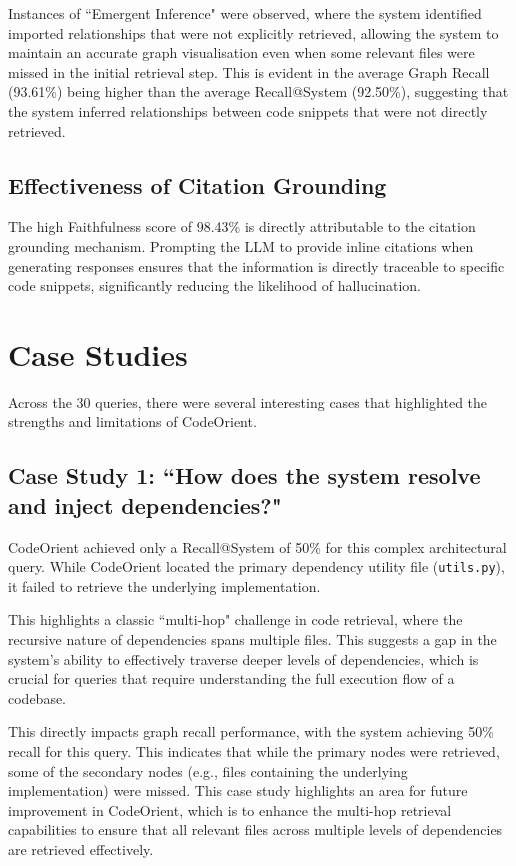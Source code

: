 Instances of ``Emergent Inference" were observed, where the system identified imported relationships that were not explicitly retrieved, allowing the system to maintain an accurate graph visualisation even when some relevant files were missed in the initial retrieval step. This is evident in the average Graph Recall (93.61\%) being higher than the average Recall@System (92.50\%), suggesting that the system inferred relationships between code snippets that were not directly retrieved.

\subsection{Effectiveness of Citation Grounding}
The high Faithfulness score of 98.43\% is directly attributable to the citation grounding mechanism. Prompting the LLM to provide inline citations when generating responses ensures that the information is directly traceable to specific code snippets, significantly reducing the likelihood of hallucination.
\section{Case Studies}
Across the 30 queries, there were several interesting cases that highlighted the strengths and limitations of CodeOrient.
\subsection{Case Study 1: ``How does the system resolve and inject dependencies?"}
\label{Case_Study_1}
CodeOrient achieved only a Recall@System of 50\% for this complex architectural query. While CodeOrient located the primary dependency utility file (\texttt{utils.py}), it failed to retrieve the underlying implementation.

This highlights a classic ``multi-hop" challenge in code retrieval, where the recursive nature of dependencies spans multiple files. This suggests a gap in the system's ability to effectively traverse deeper levels of dependencies, which is crucial for queries that require understanding the full execution flow of a codebase.

This directly impacts graph recall performance, with the system achieving 50\% recall for this query. This indicates that while the primary nodes were retrieved, some of the secondary nodes (e.g., files containing the underlying implementation) were missed. This case study highlights an area for future improvement in CodeOrient, which is to enhance the multi-hop retrieval capabilities to ensure that all relevant files across multiple levels of dependencies are retrieved effectively.

